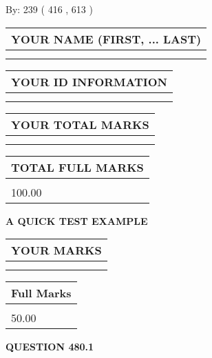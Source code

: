\documentclass[12pt]{article}
\begin{document}
   
\hspace{1.0in} By: 
 239 ( 416 ,  613 )
   
   
   
   
\newpage 
\setcounter{page}{ 
   480001 } 
   
   
   
   
\noindent\begin{tabular}{|l|}
\hline
YOUR NAME (FIRST, ... LAST)  \\
\hline
 \\ 
 \\ 
\hline
\end{tabular}
\hspace{0.05in} \begin{tabular}{|l|}
\hline
 YOUR   ID   INFORMATION  \\
\hline
 \\ 
 \\ 
\hline
\end{tabular}
   
   
\vspace{0.2in}\noindent\begin{tabular}{|l|}
\hline
YOUR TOTAL MARKS  \\
\hline
 \\ 
 \\ 
\hline
\end{tabular}
\hspace{0.05in} \begin{tabular}{|l|}
\hline
TOTAL FULL MARKS  \\
\hline
 \\ 
100.00 \\
\hline
\end{tabular}
   
   
 \vspace{0.2in}
{\LARGE {\textbf{ A QUICK TEST EXAMPLE}}}
   
   
  
\vspace{0.2in}
  
\noindent\begin{tabular}{|l|}
\hline
 YOUR MARKS  \\
\hline
 \\ 
 \\ 
\hline
\end{tabular}
\hspace{0.05in} \begin{tabular}{|l|}
\hline
 Full Marks  \\
\hline
 \\ 
50.00 \\
\hline
\end{tabular}
{\textbf{\Large{QUESTION
480.1 
}}}
  
\end{document}
